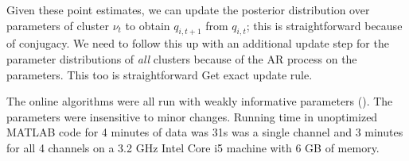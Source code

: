 Given these point estimates, we can update the posterior distribution over parameters of cluster $\nu_t$ to obtain $q_{i,t+1}$ from $q_{i,t}$; this
is straightforward because of conjugacy. 
We need to follow this up with an additional update step for the parameter distributions of \emph{all} clusters because of the AR process on the parameters.
This too is straightforward {\color{red} Get exact update rule}.

The online algorithms were all run with weakly informative parameters (). The parameters were insensitive to minor changes.  Running time in unoptimized MATLAB code for 4 minutes of data was 31s was a single channel and 3 minutes for all 4 channels on a 3.2 GHz Intel Core i5 machine with 6 GB of memory.
